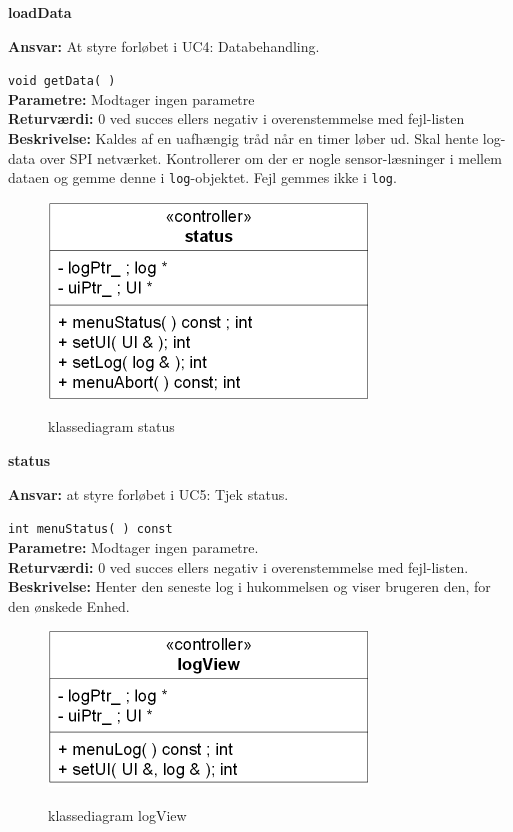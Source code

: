 {\centering
\textbf{loadData}\par
}
\textbf{Ansvar:} At styre forløbet i UC4: Databehandling. \

\verb+void getData( )+ \\
\textbf{Parametre:} Modtager ingen parametre \\
\textbf{Returværdi:} 0 ved succes ellers negativ i overenstemmelse med fejl-listen \\
\textbf{Beskrivelse:} Kaldes af en uafhængig tråd når en timer løber ud. Skal hente log-data over SPI netværket. Kontrollerer om der er nogle sensor-læsninger i mellem dataen og gemme denne i \verb+log+-objektet. Fejl gemmes ikke i \verb+log+.\\

\begin{figure}[htbp] \centering
{\includegraphics[scale=1.5]{filer/design/Klassediagrammer/sw_status}}
\caption{klassediagram status}
\label{fig:status klassediagram}
\end{figure} 

\newpage

{\centering
\textbf{status}\par
}
\textbf{Ansvar:} at styre forløbet i UC5: Tjek status. \

\verb+int menuStatus( ) const+ \\
\textbf{Parametre:} Modtager ingen parametre. \\
\textbf{Returværdi:} 0 ved succes ellers negativ i overenstemmelse med fejl-listen. \\
\textbf{Beskrivelse:} Henter den seneste log i hukommelsen og viser brugeren den, for den ønskede Enhed.\\

\begin{figure}[htbp] \centering
{\includegraphics[scale=1.5]{filer/design/Klassediagrammer/sw_logView}}
\caption{klassediagram logView}
\label{fig:logView klassediagram}
\end{figure}

